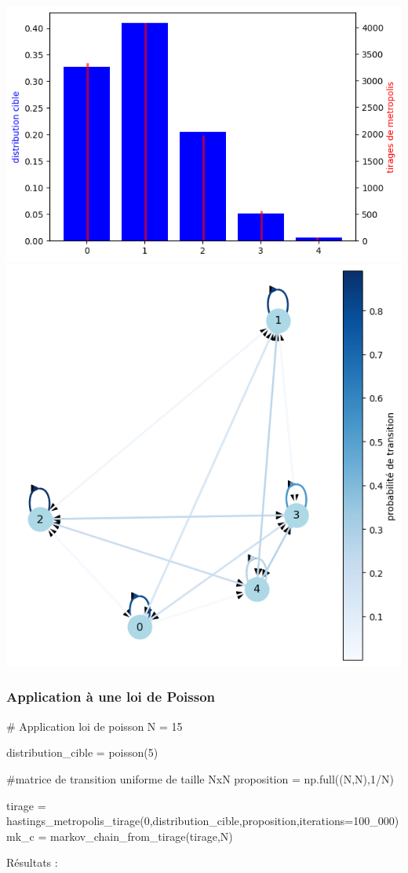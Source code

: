 \documentclass{article}
\begin{document}
\includegraphics[scale=0.25]{loi bin.png}
\includegraphics[scale=0.25]{loi bin graph.png}

\newpage
\subsubsection{Application à une loi de Poisson}

\begin{center}
\begin{python}
# Application loi de poisson
N = 15

distribution_cible = poisson(5)

#matrice de transition uniforme de taille NxN
proposition = np.full((N,N),1/N)

tirage = hastings_metropolis_tirage(0,distribution_cible,proposition,iterations=100_000)
mk_c = markov_chain_from_tirage(tirage,N)
\end{python}
\end{center}
Résultats :
\end{document}

